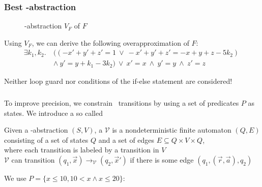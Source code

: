 \documentclass[%
10pt,
dvipsnames,
]{beamer}
\begin{document}
\begin{frame}[t]
	\frametitle{Best \qvasr-abstraction}
	\begin{center}
		\begin{figure}
		
		\caption*{\qvasr-abstraction $V_F$ of $F$}
		\end{figure}
	\end{center}
\pause
Using $V_F$, we can derive the following overapproximation of $F$:
	\begin{align*}
		\exists k_1, k_2.\ &((-x' + y' + z' = 1\ \lor\ -x' + y' + z' = -x + y + z - 5k_2)\ \\ &\land\ y' = y + k_1 - 3k_2)\ \lor\ x' = x\ \land\ y' = y\ \land\ z' = z
	\end{align*}
\pause
\vspace*{-0.5cm}
\begin{center}
\alert{Neither loop guard nor conditions of the if-else statement are considered!}
\end{center}
\end{frame}


\begin{frame}[t]
	\frametitle{\qvasrs}
	To improve precision, we constrain \qvasr\ transitions by using a set of predicates $P$ as states. We introduce a so called \qvasrs
	\begin{definition}
		Given a \qvasr-abstraction $(S,V)$, a \qvasrs $\mathcal{V}$ is a nondeterministic finite automaton $(Q, E)$ consisting of a set of states $Q$ and a set of edges $E \subseteq Q \times V \times Q$, \\
		where each transition is labeled by a transition in $V$ \\
		$\mathcal{V}$ can transition $(q_1, \vec{x}) \rightarrow_\mathcal{V} (q_2, \vec{x}')$ if there is some edge $(q_1, (\vec{r}, \vec{a}), q_2)$
	\end{definition}
	We use $P = \{ x \leq 10, 10 < x \land x \leq 20\}:$ \\ \vspace{0.5cm}
	
\end{frame}

\end{document}
